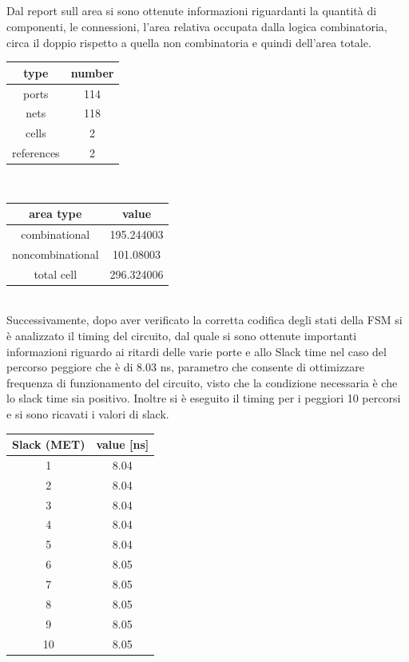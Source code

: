 \\
\\
\\
\\
Dal report sull area si sono ottenute informazioni riguardanti la quantità di componenti, le connessioni, l’area relativa occupata dalla logica combinatoria, circa il doppio rispetto a quella non combinatoria e quindi dell’area totale.
\begin{table}[!h]\footnotesize
	\centering
	\begin{tabular}{|c|c|}
		\hline
		\textbf{type} & \textbf{number}\\
		\hline
		ports & 114\\
		\hline
		nets & 118\\
		\hline
		cells & 2\\
		\hline
		references & 2\\
		\hline
	\end{tabular}
\end{table} \\
\begin{table}[!h]\footnotesize
	\centering
	\begin{tabular}{|c|c|}
		\hline
		\textbf{area type} & \textbf{value}\\
		\hline
		combinational & 195.244003\\
		\hline
		noncombinational & 101.08003\\
		\hline
		total cell & 296.324006\\
		\hline
	\end{tabular}
\end{table} \\
Successivamente, dopo aver verificato la corretta codifica degli stati della FSM  si è analizzato il timing del circuito, dal quale si sono ottenute importanti informazioni riguardo ai ritardi delle varie porte e allo Slack time nel caso del percorso peggiore che è di 8.03 ns, parametro che consente di ottimizzare frequenza di funzionamento del circuito, visto che la condizione necessaria è che lo slack time sia positivo. Inoltre si è eseguito il timing per  i peggiori 10 percorsi e si sono ricavati i valori di slack.
\begin{table}[!h]\footnotesize
	\centering
	\begin{tabular}{|c|c|}
		\hline
		\textbf{Slack (MET)} & \textbf{value [ns]}\\
		\hline
		1 & 8.04\\
		\hline
		2 & 8.04\\
		\hline
		3 & 8.04\\
		\hline
		4 & 8.04\\
		\hline
		5 & 8.04\\
		\hline
		6 & 8.05\\
		\hline
		7 & 8.05\\
		\hline
		8 & 8.05\\
		\hline
		9 & 8.05\\
		\hline
		10 & 8.05\\
		\hline
	\end{tabular}
\end{table} \\
